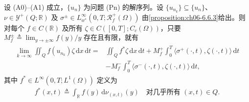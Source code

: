 \documentclass[../../main.tex]{subfiles}%
\begin{document}
\begin{proposition}\label{proposition:ch06-6.6.4}
设 (A0)--(A1) 成立，$\{u_n\}$ 为问题 (Pn) 的解序列。设 $\{u_{n_k}\}\subseteq\{u_n\}$、$\nu\in\mathcal{Y}^+(Q;\mathbb{R})$ 及 $\sigma^\pm\in L^\infty_{w^*}(0,T;\mathscr{R}^+_f(\Omega))$ 由\cref{proposition:ch06-6.6.3}给出。则对每个 $f\in C(\mathbb{R})$ 及所有 $\zeta\in C([0,T];C_c(\Omega))$，只要 $M^\pm_f\triangleq\lim_{y\to\pm\infty}f(y)/y$ 存在且有限，就有
\begin{align}
\begin{aligned}
\lim_{k\to\infty}\iint_Q f(u_{n_k})\zeta\,\mathrm{d}x\,\mathrm{d}t
={}&\iint_Q f^*\zeta\,\mathrm{d}x\,\mathrm{d}t
+M^+_f\int_0^T\langle\sigma^+(\cdot,t),\zeta(\cdot,t)\rangle\,\mathrm{d}t\\
&-M^-_f\int_0^T\langle\sigma^-(\cdot,t),\zeta(\cdot,t)\rangle\,\mathrm{d}t,
\end{aligned} 
\label{align:ch6-6.98}
\end{align}
其中 $f^*\in L^\infty(0,T;L^1(\Omega))$ 定义为
\begin{align}
f^*(x,t)\triangleq \int_\mathbb{R}f(y)\,\mathrm{d}\nu_{(x,t)}(y)
\quad\text{对几乎所有 }(x,t)\in Q. \label{align:ch6-6.99}
\end{align}
\end{proposition}
\end{document}
